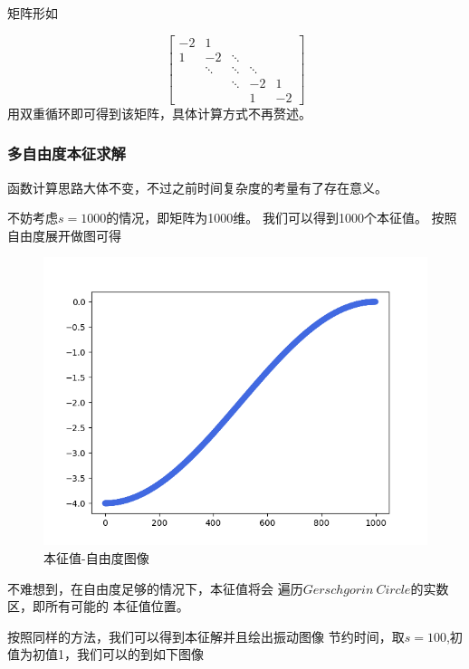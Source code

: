 \documentclass[11pt, a4paper, oneside]{ctexart}
\begin{document}
{{{矩阵形如

$$
\left[\begin{array}{ccccc}
-2 & 1 &   & \\
1 & -2 & \ddots & & \\
& \ddots & \ddots  & \ddots & \\
&   & \ddots & -2 & 1 \\
&   & & 1 & -2
\end{array}\right]
$$
用双重循环即可得到该矩阵，具体计算方式不再赘述。

\subsubsection{多自由度本征求解}

函数计算思路大体不变，不过之前时间复杂度的考量有了存在意义。

不妨考虑$s=1000$的情况，即矩阵为1000维。
我们可以得到1000个本征值。
按照自由度展开做图可得
\begin{figure}[H]
        
    \centering
    \vspace{2mm}
    \includegraphics[scale=0.45]{v-1000.png}
    \caption{本征值-自由度图像 }
\end{figure} 
不难想到，在自由度足够的情况下，本征值将会
遍历$Gerschgorin\ Circle$的实数区，即所有可能的
本征值位置。

按照同样的方法，我们可以得到本征解并且绘出振动图像
节约时间，取$s=100$,初值为初值1，我们可以的到如下图像
\begin{figure}[H]
        

\end{figure}}}}
\end{document}
